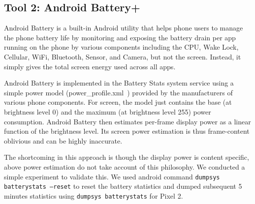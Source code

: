 \subsection{Tool 2: Android Battery+}
\label{subsec:tool2}

%    
%     

Android Battery is a built-in Android utility that helps phone users to
manage the phone battery life by monitoring and exposing the battery drain
per app running on the phone by various components including the CPU,
Wake Lock, Cellular, WiFi, Bluetooth, Sensor, and Camera, but not the
screen. Instead, it simply gives the total screen energy used across
all apps.

Android Battery is implemented in the Battery Stats system service using a simple power model
(power\_profile.xml~\cite{AOSPPowerProfile}) provided by the
manufacturers of various phone components. For screen, the model just
contains the base (at brightness level 0) and the maximum (at brightness level 255) power
consumption. Android Battery then estimates
  per-frame display power as a linear function of the brightness level.
  Its screen power estimation is thus frame-content oblivious and can be highly
  inaccurate.

The shortcoming in this approach is though the display power is content 
specific, above power estimation do not take account of this philosophy.
We conducted a simple experiment to validate this. We used android command
{\small \tt dumpsys batterystats --reset} to reset the battery statistics and
dumped subsequent 5 minutes statistics using {\small \tt dumpsys batterystats} for Pixel 2.


